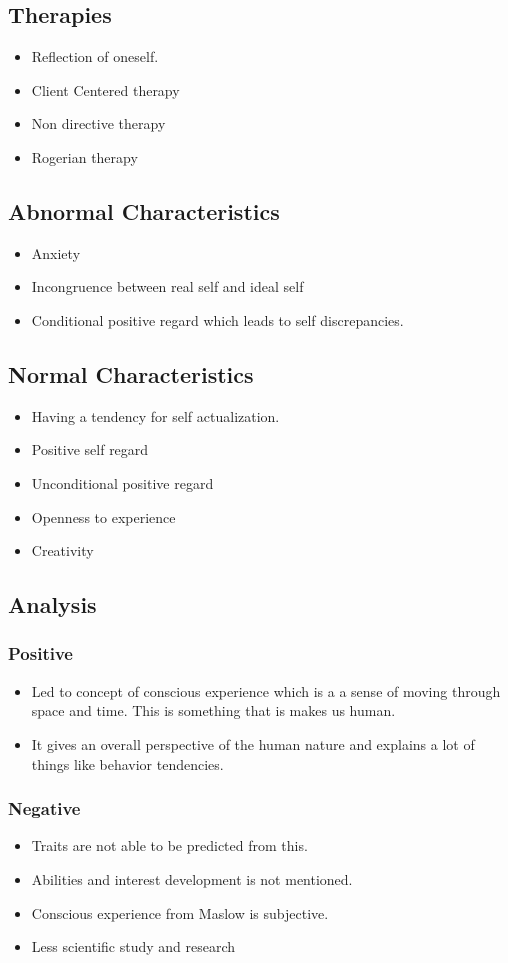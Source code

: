 \documentclass{article}
\begin{document}
		\subsection{Therapies}
			\begin{itemize}
				\item Reflection of oneself.
				\item Client Centered therapy
				\item Non directive therapy
				\item Rogerian therapy
			\end{itemize}
		\subsection{Abnormal Characteristics}
			\begin{itemize}
				\item Anxiety
				\item Incongruence between real self and ideal self
				\item Conditional positive regard which leads to self discrepancies.
			\end{itemize}
		\subsection{Normal Characteristics}
			\begin{itemize}
				\item Having a tendency for self actualization.
				\item Positive self regard
				\item Unconditional positive regard
				\item Openness to experience
				\item Creativity
			\end{itemize}
		\subsection{Analysis}
			\subsubsection{Positive}
				\begin{itemize}
					\item Led to concept of conscious experience which is a a sense of moving through space and time. This is something that is makes us human.
					\item It gives an overall perspective of the human nature and explains a lot of things like behavior tendencies.
				\end{itemize}
			\subsubsection{Negative}
				\begin{itemize}
					\item Traits are not able to be predicted from this.
					\item Abilities and interest development is not mentioned.
					\item Conscious experience from Maslow is subjective.
					\item Less scientific study and research
				\end{itemize}
\end{document}
